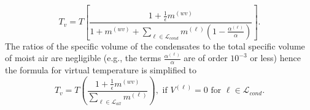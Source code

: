 \documentclass{agujournal}
\begin{document}
{\begin{equation}
T_v =T\left[ \frac{1+\frac{1}{\epsilon}m^{(wv)}}{1+m^{(wv)}+\sum_{\ell\in \mathcal{L}_{cond}}m^{(\ell)}\left(1-\frac{\alpha^{(\ell)}}{\alpha}\right)}\right].
\end{equation}
The ratios of the specific volume of the condensates to the total specific volume of moist air are negligible (e.g., the terms $\frac{\alpha^{(\ell)}}{\alpha}$ are of order $10^{-3}$ or less) hence the formula for virtual temperature is simplified to
\begin{equation}
T_v =T\left( \frac{1+\frac{1}{\epsilon}m^{(wv)}}{\sum_{\ell \in \mathcal{L}_{all}}m^{(\ell)}}\right), \text{ if } V^{(\ell)}=0 \text{ for }\ell \in \mathcal{L}_{cond}.\label{eq:tv}
\end{equation}





}
\end{document}
